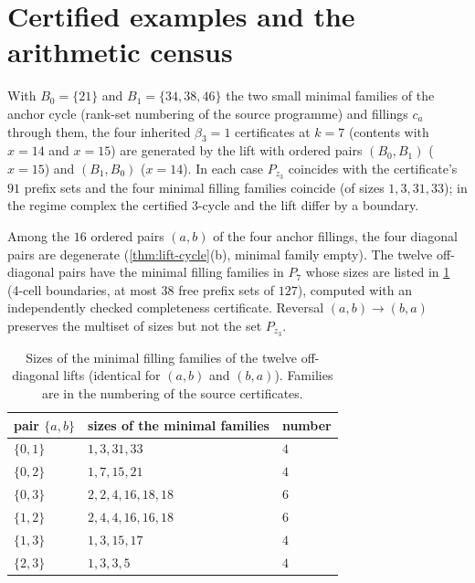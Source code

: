 \section{Certified examples and the arithmetic census}
\begin{proposition}\label{prop:H3-examples}
With $B_0=\{21\}$ and $B_1=\{34,38,46\}$ the two small minimal families of the anchor cycle (rank-set numbering of the source programme) and fillings $c_a$ through them, the four inherited $\beta_3=1$ certificates at $k=7$ (contents with $x=14$ and $x=15$) are generated by the lift with ordered pairs $(B_0,B_1)$ ($x=15$) and $(B_1,B_0)$ ($x=14$). In each case $P_{z_3}$ coincides with the certificate's $91$ prefix sets and the four minimal filling families coincide (of sizes $1,3,31,33$); in the regime complex the certified $3$-cycle and the lift differ by a boundary.
\end{proposition}
\begin{proposition}\label{prop:lift-pairs}
Among the $16$ ordered pairs $(a,b)$ of the four anchor fillings, the four diagonal pairs are degenerate (\cref{thm:lift-cycle}(b), minimal family empty). The twelve off-diagonal pairs have the minimal filling families in $P_7$ whose sizes are listed in \cref{tab:lift-pairs} (4-cell boundaries, at most $38$ free prefix sets of $127$), computed with an independently checked completeness certificate. Reversal $(a,b)\to(b,a)$ preserves the multiset of sizes but not the set $P_{z_3}$.
\begin{table}[ht]\centering\small
\begin{tabular}{@{}lll@{}}\toprule
pair $\{a,b\}$ & sizes of the minimal families & number\\ \midrule
$\{0,1\}$ & $1,3,31,33$ & $4$\\
$\{0,2\}$ & $1,7,15,21$ & $4$\\
$\{0,3\}$ & $2,2,4,16,18,18$ & $6$\\
$\{1,2\}$ & $2,4,4,16,16,18$ & $6$\\
$\{1,3\}$ & $1,3,15,17$ & $4$\\
$\{2,3\}$ & $1,3,3,5$ & $4$\\ \bottomrule
\end{tabular}
\caption{Sizes of the minimal filling families of the twelve off-diagonal lifts (identical for $(a,b)$ and $(b,a)$). Families are in the numbering of the source certificates.}\label{tab:lift-pairs}
\end{table}
\end{proposition}
